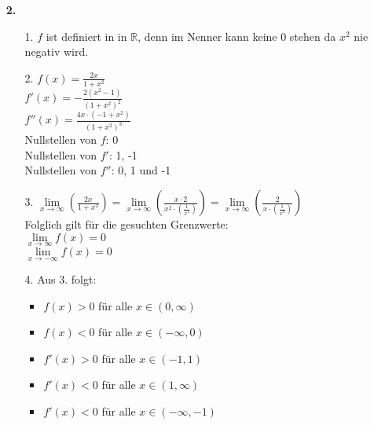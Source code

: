 \documentclass[a4paper,11pt]{scrartcl}
\newcommand{\bra}[1]{\left(#1\right)}
\newcommand{\limx}[1]{\lim\limits_{x \rightarrow \infty}\bra{#1}}
\begin{document}
\begin{enumerate}
    \item[\textbf{2.}]
        \begin{enumerate}
            \item[1.]
                $f$ ist definiert in in $\mathbb{R}$, denn im Nenner kann keine $0$ stehen da $x^2$ nie negativ wird.
            \item[2.]
                \(f(x) =  \frac{2x}{1+x^2}\) \\
                \(f'(x) =  -\frac{2(x^2-1)}{(1+x^2)^2}\) \\
                \(f''(x) =  \frac{4x \cdot (-1+x^2)}{(1+x^2)^3}\) \\
                Nullstellen von $f$: 0 \\
                Nullstellen von $f'$: 1, -1 \\
                Nullstellen von $f''$: 0, 1 und -1
            \item[3.]
                \( \limx{\frac{2x}{1+x^2}}=\limx{\frac{x \cdot 2}{x^2 \cdot (\frac{1}{x^2})}} =\limx{\frac{2}{x \cdot (\frac{1}{x^2})}} \) \\
                Folglich gilt für die gesuchten Grenzwerte: \\
                \(\lim\limits_{x \rightarrow \infty}f(x) = 0\) \\
                \(\lim\limits_{x \rightarrow -\infty}f(x) = 0\)
            \item[4.]
                Aus 3. folgt:
                \begin{itemize}
                    \item $f(x) > 0$ für alle $x \in (0,\infty)$
                    \item $f(x) < 0$ für alle $x \in (-\infty,0)$  
                \end{itemize}
                \begin{itemize}
                    \item $f'(x) > 0$ für alle $x \in (-1,1)$
                    \item $f'(x) < 0$ für alle $x \in (1,\infty)$
                    \item $f'(x) < 0$ für alle $x \in (-\infty,-1)$  
                \end{itemize}


\end{enumerate}
\end{enumerate}
\end{document}
